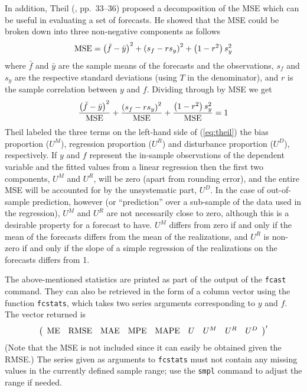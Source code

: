 In addition, Theil (\citeyear{theil66}, pp.\ 33--36) proposed a
decomposition of the MSE which can be useful in evaluating a set of
forecasts.  He showed that the MSE could be broken down into three
non-negative components as follows
%
\[
{\rm MSE} = \left(\bar{f}-\bar{y}\right)^2 + 
  \left(s_f - rs_y\right)^2 + 
  \left(1-r^2\right) s_y^2
\]
%
where $\bar{f}$ and $\bar{y}$ are the sample means of the forecasts
and the observations, $s_f$ and $s_y$ are the respective standard
deviations (using $T$ in the denominator), and $r$ is the sample
correlation between $y$ and $f$.  Dividing through by MSE we get
%
\begin{equation}
\label{eq:theil}
\frac{\left(\bar{f}-\bar{y}\right)^2}{\rm MSE} +
\frac{\left(s_f - rs_y\right)^2}{\rm MSE} + 
\frac{\left(1-r^2\right) s_y^2}{\rm MSE} = 1
\end{equation}
%
Theil labeled the three terms on the left-hand side of
(\ref{eq:theil}) the bias proportion ($U^M$), regression proportion
($U^R$) and disturbance proportion ($U^D$), respectively. If $y$ and
$f$ represent the in-sample observations of the dependent variable and
the fitted values from a linear regression then the first two
components, $U^M$ and $U^R$, will be zero (apart from rounding error),
and the entire MSE will be accounted for by the unsystematic part,
$U^D$.  In the case of out-of-sample prediction, however (or
``prediction'' over a sub-sample of the data used in the regression),
$U^M$ and $U^R$ are not necessarily close to zero, although this is a
desirable property for a forecast to have. $U^M$ differs from zero if
and only if the mean of the forecasts differs from the mean of the
realizations, and $U^R$ is non-zero if and only if the slope of a
simple regression of the realizations on the forecasts differs from
1.

The above-mentioned statistics are printed as part of the output of
the \texttt{fcast} command.  They can also be retrieved in the form of
a column vector using the function \texttt{fcstats}, which takes two
series arguments corresponding to $y$ and $f$.  The vector returned is
%
\[
\left(
\begin{array}{lllllllll}
{\rm ME} & {\rm RMSE} & {\rm MAE} & {\rm MPE} & {\rm MAPE} &
U & U^M & U^R & U^D
\end{array}
\right)'
\]
%
(Note that the MSE is not included since it can easily be obtained
given the RMSE.)  The series given as arguments to \texttt{fcstats}
must not contain any missing values in the currently defined sample
range; use the \texttt{smpl} command to adjust the range if needed.

